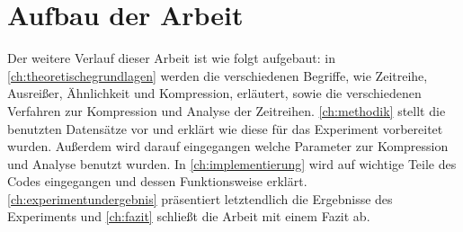 \section{Aufbau der Arbeit}
Der weitere Verlauf dieser Arbeit ist wie folgt aufgebaut: in \autoref{ch:theoretischegrundlagen} werden die verschiedenen Begriffe, wie Zeitreihe, Ausreißer, Ähnlichkeit und Kompression, erläutert, sowie die verschiedenen Verfahren zur Kompression und Analyse der Zeitreihen. \autoref{ch:methodik} stellt die benutzten Datensätze vor und erklärt wie diese für das Experiment vorbereitet wurden. Außerdem wird darauf eingegangen welche Parameter zur Kompression und Analyse benutzt wurden. In \autoref{ch:implementierung} wird auf wichtige Teile des Codes eingegangen und dessen Funktionsweise erklärt. \autoref{ch:experimentundergebnis} präsentiert letztendlich die Ergebnisse des Experiments und \autoref{ch:fazit} schließt die Arbeit mit einem Fazit ab.